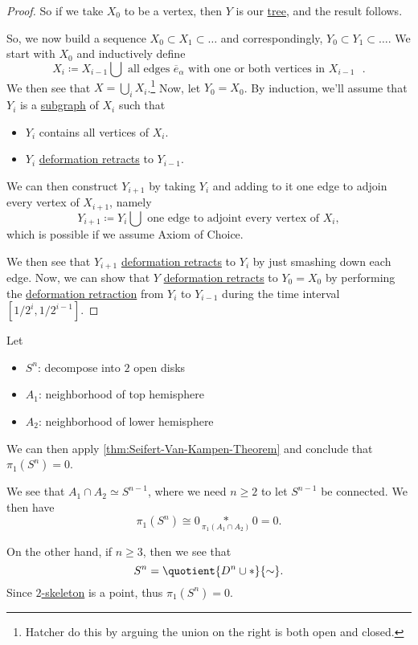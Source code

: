 \begin{proof}
	So if we take \(X_0\) to be a vertex, then \(Y\) is our \hyperref[def:tree]{tree}, and the result follows.

	So, we now build a sequence \(X_0\subset X_1\subset \dots  \) and correspondingly, \(Y_0\subset Y_1\subset \dots\). We start with
	\(X_0\) and inductively define
	\[
		X_i \coloneqq X_{i-1}\bigcup \text{ all edges \(\overline{e} _\alpha \) with one or both vertices in \(X_{i-1}\) }.
	\]
	We then see that \(X = \bigcup_{i} X_{i} \).\footnote{Hatcher\cite{hatcher2002algebraic} do this by arguing the union on the right is both open and closed.}
	Now, let \(Y_0 = X_0\). By induction, we'll assume that \(Y_{i}\) is a \hyperref[def:subgraph]{subgraph} of \(X_{i}\) such that
	\begin{itemize}
		\item \(Y_{i}\) contains all vertices of \(X_{i}\).
		\item \(Y_{i}\) \hyperref[def:deformation-retraction]{deformation retracts} to \(Y_{i-1}\).
	\end{itemize}
	We can then construct \(Y_{i+1}\) by taking \(Y_{i}\) and adding to it one edge to adjoin every vertex of \(X_{i+1}\), namely
	\[
		Y_{i+1} \coloneqq  Y_{i}\bigcup \text{ one edge to adjoint every vertex of \(X_{i}\)},
	\]
	which is possible if we assume Axiom of Choice.

	We then see that \(Y_{i+1}\) \hyperref[def:deformation-retraction]{deformation retracts} to \(Y_{i}\) by just smashing down each edge. Now, we can show that
	\(Y\) \hyperref[def:deformation-retraction]{deformation retracts} to \(Y_0 = X_0\) by performing the \hyperref[def:deformation-retraction]{deformation retraction}
	from \(Y_{i}\) to \(Y_{i-1}\) during the time interval \([1/2^i, 1/2^{i-1}]\).
\end{proof}

\begin{eg}
	Let
	\begin{itemize}
		\item \(S^n\): decompose into \(2\) open disks
		\item \(A_1\): neighborhood of top hemisphere
		\item \(A_2\): neighborhood of lower hemisphere
	\end{itemize}
	We can then apply \autoref{thm:Seifert-Van-Kampen-Theorem} and conclude that \(\pi _1(S^n) = 0\).
\end{eg}
\begin{explanation}
	We see that \(A_1 \cap A_2\simeq S^{n-1}\), where we need \(n\geq 2\) to let \(S^{n-1}\) be connected. We then have
	\[
		\pi _1(S^n)\cong 0\underset{\pi _1(A_1 \cap A_2)}{\ast}0 = 0.
	\]

	On the other hand, if \(n\geq 3\), then we see that
	\[
		S^n = \quotient{D^{n} \cup \ast}{\sim} .
	\]
	Since \hyperref[def:skeleton]{\(2\)-skeleton} is a point, thus \(\pi _1(S^n) = 0\).
\end{explanation}

